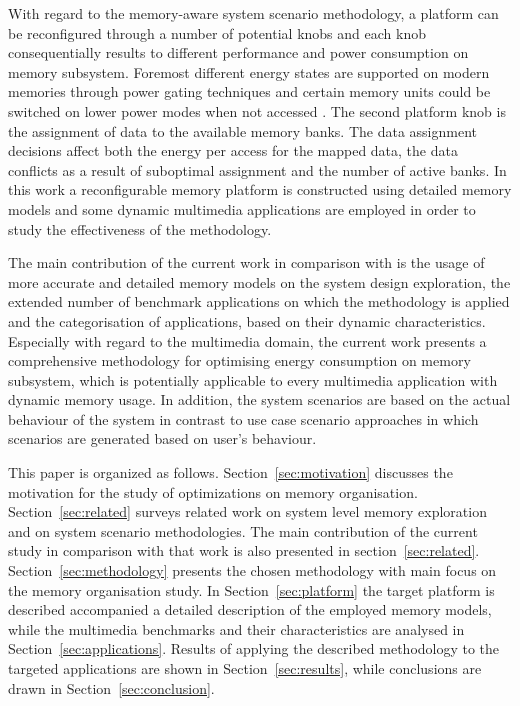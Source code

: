 \documentclass[a4paper,conference]{IEEEtran}
\begin{document}
With regard to the memory-aware system scenario methodology, a platform can be reconfigured through a number of potential knobs and each knob consequentially results to different performance and power consumption on memory subsystem. Foremost different energy states are supported on modern memories through power gating techniques and certain memory units could be switched on lower power modes when not accessed \cite{Fil12}. The second platform knob is the assignment of data to the available memory banks. The data assignment decisions affect both the energy per access for the mapped data, the data conflicts as a result of suboptimal assignment and the number of active banks. In this work a reconfigurable memory platform is constructed using detailed memory models and some dynamic multimedia applications are employed in order to study the effectiveness of the methodology.

The main contribution of the current work in comparison with \cite{Fil12} is the usage of more accurate and detailed memory models on the system design exploration, the extended number of benchmark applications on which the methodology is applied and the categorisation of applications, based on their dynamic characteristics. Especially with regard to the multimedia domain, the current work presents a comprehensive methodology for optimising energy consumption on memory subsystem, which is potentially applicable to every multimedia application with dynamic memory usage. In addition, the system scenarios are based on the actual behaviour of the system in contrast to use case scenario approaches in which scenarios are generated based on user's behaviour.

This paper is organized as follows. Section~\ref{sec:motivation} discusses the motivation for the study of optimizations on memory organisation. Section~\ref{sec:related} surveys related work on system level memory exploration and on system scenario methodologies. The main contribution of the current study in comparison with that work is also presented in section~\ref{sec:related}. Section~\ref{sec:methodology} presents the chosen methodology with main focus on the memory organisation study. In Section~\ref{sec:platform} the target platform is described accompanied a detailed description of the employed memory models, while the multimedia benchmarks and their characteristics are analysed in Section~\ref{sec:applications}. Results of applying the described methodology to the targeted applications are shown in Section~\ref{sec:results}, while conclusions are drawn in Section~\ref{sec:conclusion}. 
\end{document}

